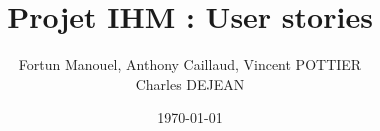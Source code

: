 \documentclass[12pt,a4paper,utf8x]{report}
\title
{
	\Huge{Projet IHM : User stories}
}
\author{Fortun Manouel, Anthony Caillaud, Vincent POTTIER\\Charles DEJEAN\\
	\vspace{45mm}
}
\date{	\today }
\begin{document}
\maketitle

%

\tableofcontents
\clearpage

\begin{onehalfspace}









\end{onehalfspace}

% 
%
% 

\printindex

\appendix
\end{document}
